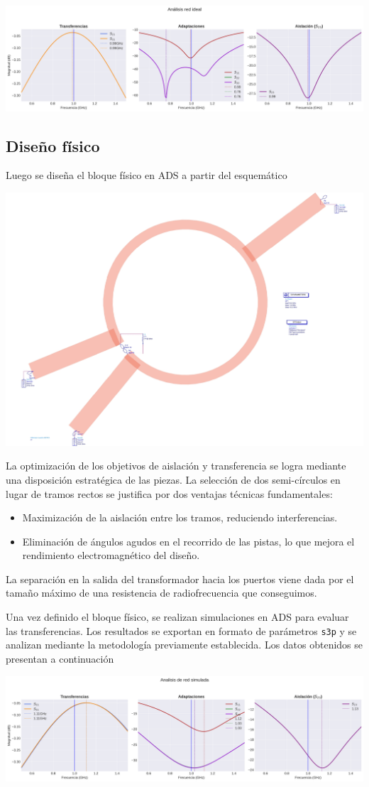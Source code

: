\documentclass[a4paper, 12pt]{article}
\begin{document}
\includegraphics[width=0.9\linewidth]{./img/plot-ideal.png}

\subsection{Diseño físico}
Luego se diseña el bloque físico en ADS a partir del esquemático

\includegraphics[width=0.6\linewidth]{./img/simulado.jpg}

La optimización de los objetivos de aislación y transferencia se logra mediante una disposición estratégica de las piezas. La selección de dos semi-círculos en lugar de tramos rectos se justifica por dos ventajas técnicas fundamentales:
\begin{itemize}
    \item Maximización de la aislación entre los tramos, reduciendo interferencias.
    \item Eliminación de ángulos agudos en el recorrido de las pistas, lo que mejora el rendimiento electromagnético del diseño.
\end{itemize}
La separación en la salida del transformador hacia los puertos viene dada por el tamaño máximo de una resistencia de radiofrecuencia que conseguimos.

Una vez definido el bloque físico, se realizan simulaciones en ADS para evaluar las transferencias. Los resultados se exportan en formato de parámetros \texttt{s3p} y se analizan mediante la metodología previamente establecida. Los datos obtenidos se presentan a continuación

\includegraphics[width=0.9\linewidth]{./img/plot-simulado.png}
\end{document}
